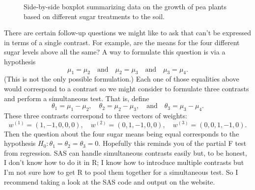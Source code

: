 \documentclass[a4paper, 12pt]{article}
\theoremstyle{plain}
\theoremstyle{definition}
\theoremstyle{remark}
\begin{document}
\begin{figure}[t]
\begin{center}
\end{center}
\caption{Side-by-side boxplot summarizing data on the growth of pea plants based on different sugar treatments to the soil.}
\label{fig:pea.boxplot}
\end{figure}

There are certain follow-up questions we might like to ask that can't be expressed in terms of a single contrast.  For example, are the means for the four different sugar levels above all the same?  A way to formulate this question is via a hypothesis 
\[ \mu_1 = \mu_2 \quad \text{and} \quad \mu_2 = \mu_3 \quad \text{and} \quad \mu_3 = \mu_4. \]
(This is not the only possible formulation.)  Each one of those equalities above would correspond to a contrast so we might consider to formulate three contrasts and perform a simultaneous test.  That is, define 
\[ \theta_1 = \mu_1 - \mu_2, \quad \theta_2 = \mu_2 - \mu_3, \quad \text{and} \quad \theta_3 = \mu_3 - \mu_4. \]
These three contrasts correspond to three vectors of weights:
\[ w^{(1)} = (1, -1, 0, 0, 0), \quad w^{(2)} = (0, 1, -1, 0, 0), \quad w^{(3)} = (0, 0, 1, -1, 0). \]
Then the question about the four sugar means being equal corresponds to the hypothesis $H_0: \theta_1 = \theta_2 = \theta_3 = 0$.  Hopefully this reminds you of the partial F test from regression.  SAS can handle simultaneous contrasts easily but, to be honest, I don't know how to do it in R; I know how to introduce multiple contrasts but I'm not sure how to get R to pool them together for a simultaneous test.  So I recommend taking a look at the SAS code and output on the website.  
\end{document}

